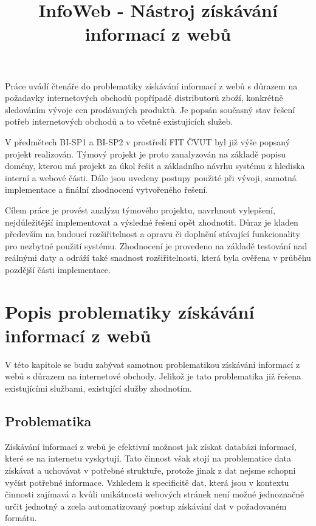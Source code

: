 \documentclass[thesis=B,czech]{FITthesis}[2012/06/26]
\title{ InfoWeb - Nástroj získávání informací z webů }
\begin{document}

\begin{introduction}
Práce uvádí čtenáře do problematiky získávání informací z webů s důrazem na požadavky internetových obchodů popřípadě distributorů zboží, 
konkrétně sledováním
vývoje cen prodávaných produktů. Je popsán současný stav řešení potřeb internetových obchodů a to včetně existujících služeb.
\par
V předmětech BI-SP1 a BI-SP2 v prostředí FIT ČVUT byl již výše popsaný projekt realizován.
Týmový projekt je proto zanalyzován na základě popisu domény, kterou má projekt za úkol řešit a základního návrhu systému
z hlediska interní a webové části. Dále jsou uvedeny postupy použité při vývoji, samotná implementace a finální zhodnocení vytvořeného řešení.
\par
Cílem práce je provést analýzu týmového projektu, navrhnout vylepšení, nejdůležitější implementovat a výsledné řešení opět zhodnotit. Důraz je kladen především na 
budoucí rozšiřitelnost a opravu či doplnění stávající funkcionality pro nezbytné použití systému. Zhodnocení je provedeno na základě
testování nad reálnými daty a odráží také snadnost rozšiřitelnosti, která byla ověřena v průběhu pozdější části implementace.
\par

\newpage

\end{introduction}


\chapter{Popis problematiky získávání informací z webů}

V této kapitole se budu zabývat samotnou problematikou získávání informací 
z webů s důrazem na internetové obchody.
Jelikož je tato problematika již řešena existujícími službami, existující služby zhodnotím.

\section{Problematika}
Získávání informací z webů je efektivní možnost jak získat databázi informací, které se na internetu vyskytují.
Tato činnost však stojí na problematice data získávat a uchovávat v potřebné struktuře, protože 
jinak z dat nejsme schopni vyčíst potřebné informace.
Vzhledem k specificitě dat, která jsou v kontextu činnosti zajímavá a kvůli unikátnosti webových stránek
není možné jednoznačně určit jednotný a zcela automatizovaný postup získávání dat v požadovaném formátu.
\end{document}
